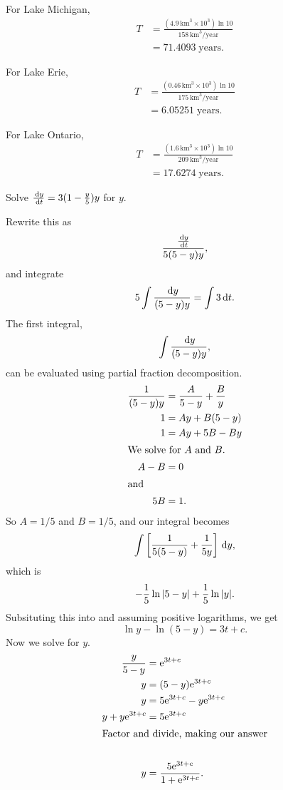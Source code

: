 \begin{ex}
\begin{enumerate}
\begin{sol}
          For Lake Michigan,
          \begin{align*}
            T&=\frac{\left(4.9\, \text{km}^3 \times 10^3\right) \ln{10}}{158\, \text{km}^3/\text{year}} \\
            &=71.4093\; \text{years}.
          \end{align*}

          For Lake Erie,
          \begin{align*}
            T&=\frac{\left(0.46 \, \text{km}^3 \times 10^3\right) \ln{10}}{175\, \text{km}^3/\text{year}} \\
            &=6.05251\; \text{years}.
          \end{align*}

          For Lake Ontario,
          \begin{align*}
            T&=\frac{\left(1.6\, \text{km}^3 \times 10^3\right) \ln{10}}{209\, \text{km}^3/\text{year}} \\
            &=17.6274\; \text{years}.
          \end{align*}
        \end{sol}
    \end{enumerate}
\end{ex}
\begin{ex}
  Solve \(\frac{\,\mathrm{d} y}{\,\mathrm{d} t}=3(1-\frac{y}{5})y \)
  for $y$.
  \begin{sol}
    Rewrite this as
    \[ \frac{\frac{\,\mathrm{d} y}{\,\mathrm{d} t}}{5(5-y)y}, \]
    and integrate
    \[ 5 \int \frac{\,\mathrm{d} y}{(5-y)y}=\int 3 \,\mathrm{d} t. \]
    The first integral,
    \begin{equation}
      \int \frac{\,\mathrm{d} y}{(5-y)y},
      \label{eq:ex1int1}
    \end{equation}
      can be evaluated using partial fraction decomposition.
    \begin{align*}
      \frac{1}{(5-y)y}&=\frac{A}{5-y}+\frac{B}{y} \\
      1&=Ay+B(5-y) \\
      1&=Ay+5B-By \\
      \intertext{We solve for $A$ and $B$.}
        A-B&=0 \\
      \intertext{and}
      5B&=1.
    \end{align*}
    So $A=1/5$ and $B=1/5$, and our integral becomes
    \[ \int \left[ \frac{1}{5(5-y)}+\frac{1}{5y} \right] \,\mathrm{d} y, \]
    which is
    \[ -\frac{1}{5} \ln {\left|5-y\right|} + \frac{1}{5} \ln {\left|y\right|}. \]
    Subsituting this into  and assuming positive logarithms, we get
    \[ \ln{y}-\ln{(5-y)}=3t+c. \]
    Now we solve for $y$.
    \begin{align*}
      \frac{y}{5-y}&=\mathrm e^{3t+c} \\
      y &= (5-y) \mathrm e^{3t+c} \\
      y&= 5\mathrm e^{3t+c}-y\mathrm e^{3t+c} \\
      y+y\mathrm e^{3t+c}&=5\mathrm e^{3t+c} \\
      \intertext{Factor and divide, making our answer} \\
      y&=\frac{5 \mathrm e^{3t+c}}{1+\mathrm e^{3t+c}}. \\
    \end{align*}
  \end{sol}
\end{ex}
